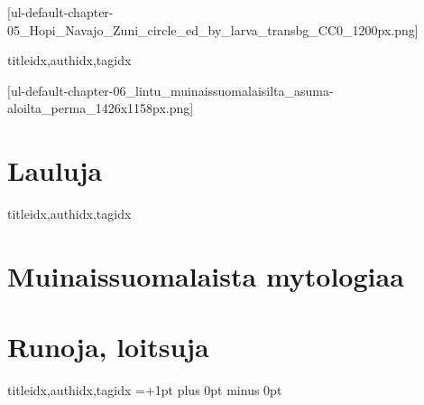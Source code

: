   [ul-default-chapter-05_Hopi_Navajo_Zuni_circle_ed_by_larva_transbg_CC0_1200px.png]
    \begin{songs}{titleidx,authidx,tagidx}
      
    \end{songs}

  [ul-default-chapter-06_lintu_muinaissuomalaisilta_asuma-aloilta_perma_1426x1158px.png]
    \begin{finnish} %
      \section{Lauluja}
        \begin{songs}{titleidx,authidx,tagidx}
          
          
        \end{songs}
      \clearpage\scleardpage
      \section{Muinaissuomalaista mytologiaa}
        
      \clearpage\scleardpage
      \section{Runoja, loitsuja}
        \begin{songs}{titleidx,authidx,tagidx}
          \chordsoff %
          \baselineadj=+1pt plus 0pt minus 0pt%
          \renewcommand{\lyricfont}{\small} %
          
        \end{songs}
    \end{finnish}

